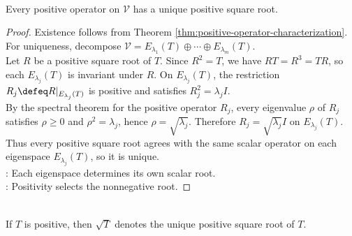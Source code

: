 \begin{proposition} \label{prop:positive-square-root-unique} \\
Every positive operator on $\mathcal{V}$ has a unique positive square root.
\begin{proof}
Existence follows from Theorem \ref{thm:positive-operator-characterization}. For uniqueness, decompose $\mathcal{V}=E_{\lambda_1}(T)\oplus\cdots\oplus E_{\lambda_m}(T)$.\\
Let $R$ be a positive square root of $T$. Since $R^2=T$, we have $RT=R^3=TR$, so each $E_{\lambda_j}(T)$ is invariant under $R$. On $E_{\lambda_j}(T)$, the restriction $R_j\defeq R|_{E_{\lambda_j}(T)}$ is positive and satisfies $R_j^2=\lambda_jI$.\\
By the spectral theorem for the positive operator $R_j$, every eigenvalue $\rho$ of $R_j$ satisfies $\rho\geq0$ and $\rho^2=\lambda_j$, hence $\rho=\sqrt{\lambda_j}$. Therefore $R_j=\sqrt{\lambda_j}I$ on $E_{\lambda_j}(T)$.\\
Thus every positive square root agrees with the same scalar operator on each eigenspace $E_{\lambda_j}(T)$, so it is unique.\\
: Each eigenspace determines its own scalar root.\\
: Positivity selects the nonnegative root.
\end{proof}
\end{proposition}

\begin{definition} \label{def:positive-square-root-notation} \\
If $T$ is positive, then $\sqrt{T}$ denotes the unique positive square root of $T$.
\end{definition}
